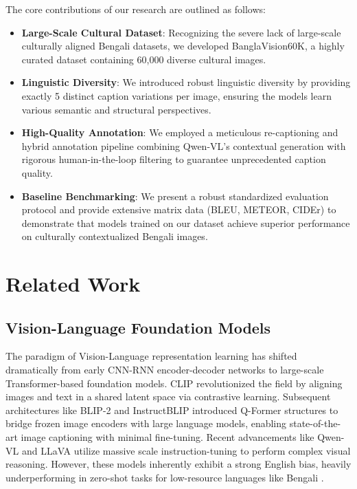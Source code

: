 \documentclass[conference]{IEEEtran}
\begin{document}
The core contributions of our research are outlined as follows:
\begin{itemize}
    \item \textbf{Large-Scale Cultural Dataset}: Recognizing the severe lack of large-scale culturally aligned Bengali datasets, we developed BanglaVision60K, a highly curated dataset containing 60,000 diverse cultural images.
    \item \textbf{Linguistic Diversity}: We introduced robust linguistic diversity by providing exactly 5 distinct caption variations per image, ensuring the models learn various semantic and structural perspectives.
    \item \textbf{High-Quality Annotation}: We employed a meticulous re-captioning and hybrid annotation pipeline combining Qwen-VL's contextual generation with rigorous human-in-the-loop filtering to guarantee unprecedented caption quality.
    \item \textbf{Baseline Benchmarking}: We present a robust standardized evaluation protocol and provide extensive matrix data (BLEU, METEOR, CIDEr) to demonstrate that models trained on our dataset achieve superior performance on culturally contextualized Bengali images.
\end{itemize}

\section{Related Work}
\subsection{Vision-Language Foundation Models}
The paradigm of Vision-Language representation learning has shifted dramatically from early CNN-RNN encoder-decoder networks to large-scale Transformer-based foundation models. CLIP \cite{radford2023clip} revolutionized the field by aligning images and text in a shared latent space via contrastive learning. Subsequent architectures like BLIP-2 \cite{li2023blip2} and InstructBLIP \cite{dai2023instructblip} introduced Q-Former structures to bridge frozen image encoders with large language models, enabling state-of-the-art image captioning with minimal fine-tuning. Recent advancements like Qwen-VL \cite{bai2023qwenvl} and LLaVA \cite{liu2023llava} utilize massive scale instruction-tuning to perform complex visual reasoning. However, these models inherently exhibit a strong English bias, heavily underperforming in zero-shot tasks for low-resource languages like Bengali \cite{mahmud2025qwen}.
\end{document}
